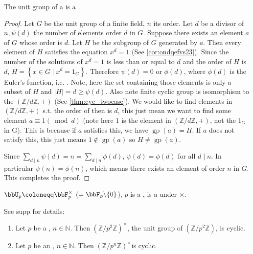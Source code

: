 \documentclass{article}
\newcommand{\gp}{\operatorname{gp}}
\begin{document}
\begin{thma}\label{thm:aibrqc}
The unit group of a  is a .
\end{thma}
\begin{proof}
Let $G$ be the unit group of a finite field, $n$ its order. Let $d$ be a divisor of $n, \psi(d)$ the number of elements order $d$ in $G$. Suppose there exists an element $a$ of $G$ whose order is $d$. Let $H$ be the subgroup of $G$ generated by $a$. Then every element of $H$ satisfies the equation $x^{d}=1$ (See \cref{cor:ondqefvs23}). Since the number of the solutions of $x^{d}=1$ is less than or equal to $d$ and the order of $H$ is $d$, $H=\left\{x \in G \mid x^{d}=1_{G}\right\}$. Therefore $\psi(d)=0$ or $\phi(d)$, where $\phi(d)$ is the Euler's function, i.e. . Note, here the set containing those elements is only a subset of $H$ and $|H|=d\ge \psi(d)$. Also note finite cyclic group is isomorphism to the $(\mathbb{Z} / d \mathbb{Z},+)$ (See \cref{thm:cyc_twocase}). We would like to find elements in $(\mathbb{Z} / d \mathbb{Z},+)$ s.t. the order of then is $d$, this just mean we want to find some element $a\equiv 1(\bmod d)$ (note here $1$ is the element in $(\mathbb{Z} / d \mathbb{Z},+)$, not the $1_{G}$ in G). This is because if $a$ satisfies this, we have $\gp(a)=H$. If $a$ does not satisfy this, this just means $1\notin \gp(a)$ so $H\ne \gp(a)$.
 
Since $\sum_{d \mid n} \psi(d)=n=\sum_{d \mid n} \phi(d)$, $\psi(d)=\phi(d)$ for all $d \mid n$. In particular $\psi(n)=\phi(n)$, which means there exists an element of order $n$ in $G$. This completes the proof.
\end{proof}

\begin{cora}
   $\bbU_p\coloneqq \bbF_p^{\times}$ ($=\bbF_p\backslash\{0\}$), $p$ is a , is a  under $\times$.
\end{cora}


\begin{cora}See supp for details:
\begin{enumerate}
    \item   Let $p$ be a , $n \in \mathbb{N}$. Then $\left(\mathbb{Z} / p^{2} \mathbb{Z}\right)^{\times}$, the unit group of $\left(\mathbb{Z} / p^{2} \mathbb{Z}\right)$, is cyclic.
    \item  Let $p$ be an , $n \in \mathbb{N}$. Then $\left(\mathbb{Z} / p^{n} \mathbb{Z}\right)^{\times}$is cyclic.
\end{enumerate}

\end{cora}
\end{document}
